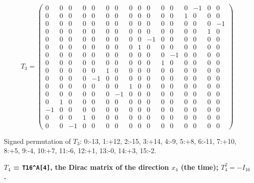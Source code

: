 \documentclass[
  10pt,
]{article}
\begin{document}
\[
T_3 = \scriptstyle \begin{pmatrix} 0 & 0 & 0 & 0 & 0 & 0 & 0 & 0 & 0 & 0 & 0 & 0 & 0 & -1 & 0 & 0 \\ 0 & 0 & 0 & 0 & 0 & 0 & 0 & 0 & 0 & 0 & 0 & 0 & 1 & 0 & 0 & 0 \\ 0 & 0 & 0 & 0 & 0 & 0 & 0 & 0 & 0 & 0 & 0 & 0 & 0 & 0 & 0 & -1 \\ 0 & 0 & 0 & 0 & 0 & 0 & 0 & 0 & 0 & 0 & 0 & 0 & 0 & 0 & 1 & 0 \\ 0 & 0 & 0 & 0 & 0 & 0 & 0 & 0 & 0 & -1 & 0 & 0 & 0 & 0 & 0 & 0 \\ 0 & 0 & 0 & 0 & 0 & 0 & 0 & 0 & 1 & 0 & 0 & 0 & 0 & 0 & 0 & 0 \\ 0 & 0 & 0 & 0 & 0 & 0 & 0 & 0 & 0 & 0 & 0 & -1 & 0 & 0 & 0 & 0 \\ 0 & 0 & 0 & 0 & 0 & 0 & 0 & 0 & 0 & 0 & 1 & 0 & 0 & 0 & 0 & 0 \\ 0 & 0 & 0 & 0 & 0 & 1 & 0 & 0 & 0 & 0 & 0 & 0 & 0 & 0 & 0 & 0 \\ 0 & 0 & 0 & 0 & -1 & 0 & 0 & 0 & 0 & 0 & 0 & 0 & 0 & 0 & 0 & 0 \\ 0 & 0 & 0 & 0 & 0 & 0 & 0 & 1 & 0 & 0 & 0 & 0 & 0 & 0 & 0 & 0 \\ 0 & 0 & 0 & 0 & 0 & 0 & -1 & 0 & 0 & 0 & 0 & 0 & 0 & 0 & 0 & 0 \\ 0 & 1 & 0 & 0 & 0 & 0 & 0 & 0 & 0 & 0 & 0 & 0 & 0 & 0 & 0 & 0 \\ -1 & 0 & 0 & 0 & 0 & 0 & 0 & 0 & 0 & 0 & 0 & 0 & 0 & 0 & 0 & 0 \\ 0 & 0 & 0 & 1 & 0 & 0 & 0 & 0 & 0 & 0 & 0 & 0 & 0 & 0 & 0 & 0 \\ 0 & 0 & -1 & 0 & 0 & 0 & 0 & 0 & 0 & 0 & 0 & 0 & 0 & 0 & 0 & 0 \end{pmatrix}
\]

Signed permutation of \(T_3\): 0:-13, 1:+12, 2:-15, 3:+14, 4:-9, 5:+8,
6:-11, 7:+10, 8:+5, 9:-4, 10:+7, 11:-6, 12:+1, 13:-0, 14:+3, 15:-2.

\textbf{\(T_4\) = \texttt{T16\^{}A{[}4{]}}, the Dirac matrix of the
direction \(x_4\) (the time); \(T_4^2 = -I_{16}\).}
\end{document}
